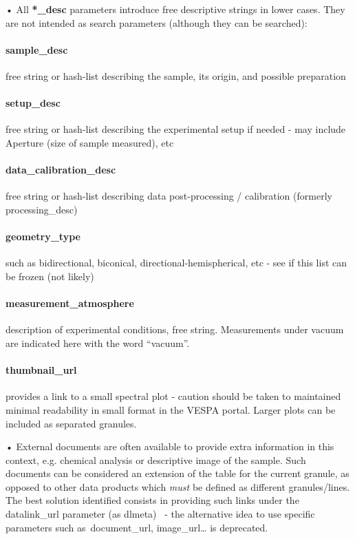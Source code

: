 \documentclass[11pt,a4paper]{ivoa}
\begin{document}
• All \textbf{*\_desc} parameters introduce free descriptive strings in lower cases. They are not intended as search parameters (although they can be searched):

\paragraph{sample\_desc}

free string or hash-list describing the sample, its origin, and possible preparation

\paragraph{setup\_desc}

free string or hash-list describing the experimental setup if needed - may include Aperture (size of sample measured), etc

\paragraph{data\_calibration\_desc}

free string or hash-list describing data post-processing / calibration (formerly processing\_desc)

\paragraph{geometry\_type}

such as bidirectional, biconical, directional-hemispherical, etc - see if this list can be frozen (not likely)

\paragraph{measurement\_atmosphere}

description of experimental conditions, free string. Measurements under vacuum are indicated here with the word ``vacuum''.

\paragraph{\textbf{thumbnail\_url}}

provides a link to a small spectral plot - caution should be taken to maintained minimal readability in small format in the VESPA portal. Larger plots can be included as separated granules.

• External documents are often available to provide extra information in this context, e.g. chemical analysis or descriptive image of the sample. Such documents can be considered an extension of the table for the current granule, as opposed to other data products which \emph{must} be defined as different granules/lines. The best solution identified consists in providing such links under the datalink\_url parameter (as dlmeta)  - the alternative idea to use specific parameters such as document\_url, image\_url… is deprecated.
\end{document}
